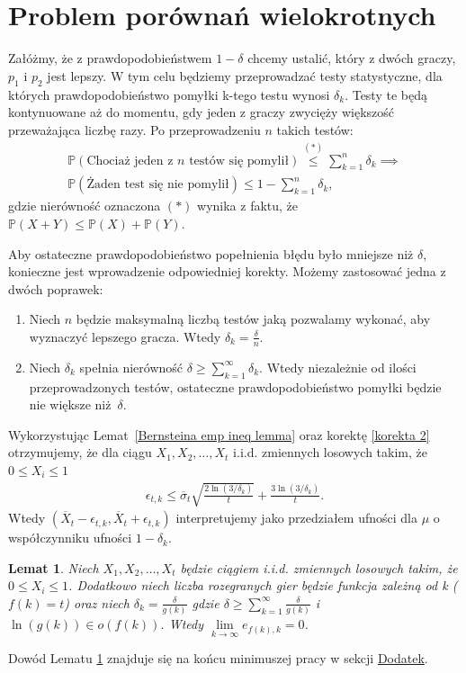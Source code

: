 \documentclass[inzynierska]{pwr_wmat_praca_dyplomowa}
\theoremstyle{plain}
\numberwithin{theorem}{chapter}
\newtheorem{lemma}[theorem]{Lemat}
\theoremstyle{definition}
\numberwithin{theorem}{chapter}
\newcommand{\probP}{\mathbb{P}}
\begin{document}
	\section{Problem porównań wielokrotnych}
	Załóżmy, że z prawdopodobieństwem $1-\delta$ chcemy ustalić, który z dwóch graczy, $p_1$ i $p_2$ jest lepszy. W tym celu będziemy przeprowadzać testy statystyczne, dla których	prawdopodobieństwo pomyłki k-tego testu wynosi $\delta_k$. Testy te będą kontynuowane aż do momentu, gdy jeden z graczy zwycięży większość przeważająca liczbę razy. Po przeprowadzeniu $n$ takich testów:
	\begin{gather*}
		\probP(\text{Chociaż jeden z $n$ testów się pomylił}) \overset{(*)}{\le} \sum_{k=1}^n \delta_k \implies  \\
	\probP(\text{Żaden test się nie pomylił}) \le 1 - \sum_{k=1}^n \delta_k,
	\end{gather*} 
	gdzie nierówność oznaczona $(*)$ wynika z faktu, że $\probP(X+Y) \le \probP(X) + \probP(Y)$.
	
	Aby ostateczne prawdopodobieństwo popełnienia błędu było mniejsze niż $\delta$, konieczne jest wprowadzenie odpowiedniej korekty.
	Możemy zastosować jedna z dwóch poprawek:
	\begin{enumerate}[label=\thesection.\arabic*]
		\item \label{korekta 1} Niech $n$ będzie maksymalną liczbą testów jaką pozwalamy wykonać, aby wyznaczyć lepszego
		gracza. Wtedy $\delta_k=\frac{\delta}{n}$.
		\item \label{korekta 2} Niech $\delta_k$ spełnia nierówność $ \delta \ge \sum_{k = 1}^{\infty}\delta_k$. Wtedy niezależnie od
		ilości przeprowadzonych testów, ostateczne
		prawdopodobieństwo pomyłki będzie nie większe niż~$\delta$.
	\end{enumerate}
	Wykorzystując Lemat~\ref{Bernsteina emp ineq lemma} oraz korektę \ref{korekta 2} otrzymujemy, że dla ciągu $X_1, X_2, \dots, X_t$ i.i.d. zmiennych losowych takim, że  $0 \le X_i \le 1$ 
	\begin{align}
		\label{Bernstein race without maximum race length}
		\epsilon_{t, k} \le \overline{\sigma}_t \sqrt{\frac{2\ln(3/\delta_k)}{t}} + \frac{3  \ln{(3 / \delta_k)}}{t}.
	\end{align}
	Wtedy $(\overline{X}_t - \epsilon_{t,k}, \overline{X}_t + \epsilon_{t,k})$ interpretujemy jako przedziałem ufności dla $\mu$ o współczynniku ufności $1-\delta_k$.
	\begin{lemma}
		\label{lemma Bernstein race without maximum race length}
		Niech $X_1, X_2, \dots, X_t$ będzie ciągiem i.i.d. zmiennych losowych takim, że  $0 \le X_i \le 1$. Dodatkowo niech liczba rozegranych gier będzie funkcja zależną od k ($f(k) = t$) oraz niech $\delta_k = \frac{\delta}{g(k)}$
		gdzie $\delta \ge \sum_{k=1}^{\infty} \frac{\delta}{g(k)}$ i $\ln(g(k)) \in o(f(k))$. Wtedy
		$\lim\limits_{k\to\infty} e_{f(k), k} = 0$. 
	\end{lemma}
	Dowód Lematu \ref{lemma Bernstein race without maximum race length} znajduje się na końcu minimuszej pracy w sekcji \hyperref[proof:lemma Bernstein race without maximum race length]{Dodatek}.
	
\end{document}

